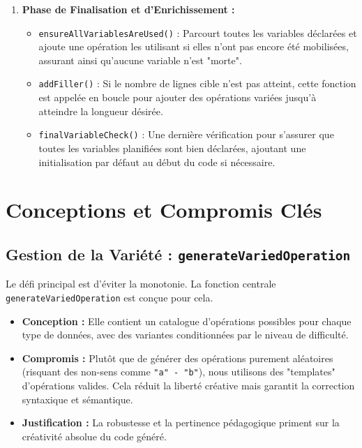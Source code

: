 \documentclass[a4paper, 11pt]{article}
\begin{document}
\begin{enumerate}[label=\arabic*.]
    \item \textbf{Phase de Finalisation et d'Enrichissement :}
    \begin{itemize}
        \item \texttt{ensureAllVariablesAreUsed()} : Parcourt toutes les variables déclarées et ajoute une opération les utilisant si elles n'ont pas encore été mobilisées, assurant ainsi qu'aucune variable n'est "morte".
        \item \texttt{addFiller()} : Si le nombre de lignes cible n'est pas atteint, cette fonction est appelée en boucle pour ajouter des opérations variées jusqu'à atteindre la longueur désirée.
        \item \texttt{finalVariableCheck()} : Une dernière vérification pour s'assurer que toutes les variables planifiées sont bien déclarées, ajoutant une initialisation par défaut au début du code si nécessaire.
    \end{itemize}
\end{enumerate}

\section{Conceptions et Compromis Clés}

\subsection{Gestion de la Variété : \texttt{generateVariedOperation}}
Le défi principal est d'éviter la monotonie. La fonction centrale \texttt{generateVariedOperation} est conçue pour cela.
\begin{itemize}
    \item \textbf{Conception :} Elle contient un catalogue d'opérations possibles pour chaque type de données, avec des variantes conditionnées par le niveau de difficulté.
    \item \textbf{Compromis :} Plutôt que de générer des opérations purement aléatoires (risquant des non-sens comme \texttt{"a" - "b"}), nous utilisons des "templates" d'opérations valides. Cela réduit la liberté créative mais garantit la correction syntaxique et sémantique.
    \item \textbf{Justification :} La robustesse et la pertinence pédagogique priment sur la créativité absolue du code généré.
\end{itemize}
\end{document}
